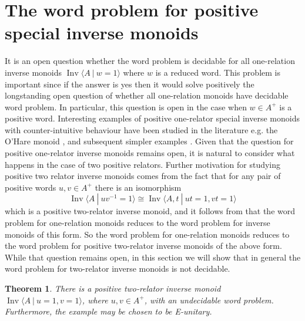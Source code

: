 \documentclass{amsart}
\newcommand{\Ipres}[2]{\operatorname{Inv}\bigl\langle #1\:|\:#2 \bigr\rangle}
\theoremstyle{plain}
\newtheorem{theorem}{Theorem}[section]
\theoremstyle{definition}
\begin{document}
\section{The word problem for positive special inverse monoids}\label{Sec:Positive-inverse-monoids}

It is an open question whether the word problem is decidable for all one-relation inverse monoids $\Ipres{A}{w=1}$ where $w$ is a reduced word. This problem is important since if the answer is yes then it would solve positively the longstanding open question of whether all one-relation monoids have decidable word problem.  In particular, this question is open in the case when $w \in A^+$ is a positive word. Interesting examples of positive one-relator special inverse monoids with counter-intuitive behaviour have been studied in the literature e.g. the O'Hare monoid \cite{Margolis1987}, and subsequent simpler examples \cite{NybergBrodda2022b}. Given that the question for positive one-relator inverse monoids remains open, it is natural to consider what happens in the case of two positive relators.  
Further motivation for studying positive two relator inverse monoids comes from the fact that for any 
pair of positive words 
$u, v \in A^+$ there is an isomorphism 
\[
\Ipres{A}{uv^{-1}=1} \cong 
\Ipres{A,t}{ut=1, vt=1}
\]  
which is a positive two-relator inverse monoid, and it follows from \cite{Ivanov2001} that the word problem for one-relation monoids reduces to the word problem for inverse monoids of this form. 
So the word problem for one-relation monoids reduces to the word problem for positive two-relator inverse monoids of the above form. 
While that question remains open,  
in this section we will show that in general the word problem for two-relator inverse monoids is not decidable.   


\begin{theorem}\label{thm_2RelatorInverseUndecWP}
There is a positive two-relator inverse monoid $\Ipres{A}{u=1, v=1}$, 
where $u, v \in A^+$,   
with an undecidable word problem. 
Furthermore, the example may be chosen to be E-unitary.  
\end{theorem}
\end{document}
